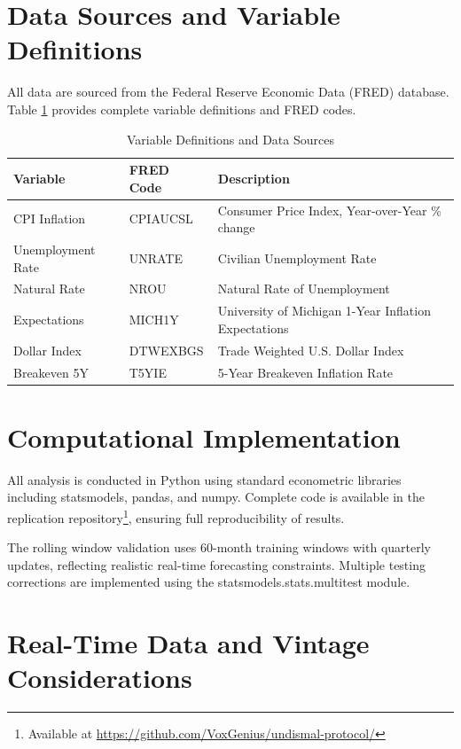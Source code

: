 \documentclass[12pt]{article}
\begin{document}



\appendix

\section{Data Sources and Variable Definitions}

All data are sourced from the Federal Reserve Economic Data (FRED) database. Table \ref{tab:variables} provides complete variable definitions and FRED codes.

\begin{table}[H]
\centering
\caption{Variable Definitions and Data Sources}
\label{tab:variables}
\begin{tabular}{lll}
\toprule
Variable & FRED Code & Description \\
\midrule
CPI Inflation & CPIAUCSL & Consumer Price Index, Year-over-Year \% change \\
Unemployment Rate & UNRATE & Civilian Unemployment Rate \\
Natural Rate & NROU & Natural Rate of Unemployment \\
Expectations & MICH1Y & University of Michigan 1-Year Inflation Expectations \\
Dollar Index & DTWEXBGS & Trade Weighted U.S. Dollar Index \\
Breakeven 5Y & T5YIE & 5-Year Breakeven Inflation Rate \\
\bottomrule
\end{tabular}
\end{table}

\section{Computational Implementation}

All analysis is conducted in Python using standard econometric libraries including statsmodels, pandas, and numpy. Complete code is available in the replication repository\footnote{Available at \url{https://github.com/VoxGenius/undismal-protocol/}}, ensuring full reproducibility of results.

The rolling window validation uses 60-month training windows with quarterly updates, reflecting realistic real-time forecasting constraints. Multiple testing corrections are implemented using the statsmodels.stats.multitest module.

\section{Real-Time Data and Vintage Considerations}
\end{document}
